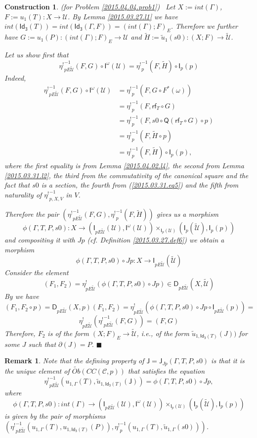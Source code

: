 \documentclass[12pt]{article}
\numberwithin{equation}{section}
\newtheorem{remark}[proposition]{Remark}
\newtheorem{construction0}[proposition]{Construction}
\newenvironment{construction}[1]{\begin{construction0}(for Problem \ref{#1})\ }{$\blacksquare$ \end{construction0}}
\newcommand{\sr}{\rightarrow}
\newcommand{\wt}{\widetilde}
\newcommand{\toCC}{CC} %
\newcommand{\C}{{\mathcal C}}  %
\newcommand{\Idx}{\mathsf{Id_3}} %
\newcommand{\J}{\mathsf{J}}
\newcommand{\U}{\mathcal{U}}
\newcommand{\D}{\mathsf{D}}
\newcommand{\I}{\mathsf{I}}
\newcommand{\rf}{\mathsf{rf}}
\newcommand{\Q}{\mathsf{Q}}
\newcommand{\etashriek}{\eta^!}
\newcommand{\etaunshriek}{{\etashriek}^{-1}}
\newcommand{\Obwt}{\wt{Ob}}
\begin{document}
\begin{construction}{2015.04.04.prob1}\rm
\label{2015.04.04.constr1} Let $X:=int(\Gamma)$, $F:=u_1(T):X\sr \U$. By Lemma
\ref{2015.03.27.l1} we have
$int(\Idx(T))=int(\Idx(\Gamma,F))=(int(\Gamma);F)_{E}$. Therefore we further
have $G:=u_1(P):(int(\Gamma);F)_{E}\sr \U$ and $\wt{H}:=\wt{u}_1(s0):(X;F)\sr
\wt{\U}$.

Let us show first that
%
$$\etaunshriek_{pE\wt{\U}}(F,G)\circ \I^{\omega}(\U)=\etaunshriek_p(F,\wt{H})\circ \I_p(p)$$
%
Indeed,
%
\begin{align*}
  \etaunshriek_{pE\wt{\U}}(F,G)\circ \I^{\omega}(\U)
    & = \etaunshriek_p(F,G\circ F^*(\omega)) \\
    & = \etaunshriek_p(F,\rf_T\circ G) \\
    & = \etaunshriek_p(F,s0\circ \Q(\rf_T\circ G)\circ p) \\
    & = \etaunshriek_p(F,\wt{H}\circ p) \\
    & = \etaunshriek_p(F,\wt{H})\circ \I_p(p),
\end{align*}
%
where the first equality is from Lemma \ref{2015.04.02.l4}, the second from
Lemma \ref{2015.03.31.l2}, the third from the commutativity of the canonical
square and the fact that $s0$ is a section, the fourth from
(\ref{2015.03.31.eq5}) and the fifth from naturality of $\etaunshriek_{p,X,V}$ in $V$.

Therefore the pair $(\etaunshriek_{pE\wt{\U}}(F,G),\etaunshriek_p(F,\wt{H}))$ gives us a
morphism
%
$$\phi(\Gamma,T,P,s0):X\sr (\I_{pE\wt{\U}}(\U), \I^{\omega}(\U)) \times_{\I_p(\U)}
(\I_p(\wt{\U}),\I_p(p))$$
%
and compositing it with $Jp$ (cf. Definition \ref{2015.03.27.def6}) we obtain a
morphism
%
$$\phi(\Gamma,T,P,s0)\circ Jp: X\sr \I_{pE\wt{\U}}(\wt{\U})$$
%
Consider the element
%
$$(F_1,F_2)=\etashriek_{pE\wt{\U}}(\phi(\Gamma,T,P,s0)\circ Jp)\in
\D_{pE\wt{\U}}(X,\wt{\U})$$
%
By \cite[Problem 3.8(1)]{fromunivwithPi} we have
%
$$(F_1,F_2\circ
p)=\D_{pE\wt{\U}}(X,p)(F_1,F_2)=\etashriek_{pE\wt{\U}}(\phi(\Gamma,T,P,s0)\circ
Jp\circ \I_{pE\wt{\U}}(p))=$$
%
$$\etashriek_{pE\wt{\U}}(\etaunshriek_{pE\wt{\U}}(F,G))=(F,G)$$
%
Therefore, $F_2$ is of the form $(X;F)_E\sr \wt{\U}$, i.e., of the form
$\wt{u}_{1,\Idx(T)}(J))$ for some $J$ such that $\partial(J)=P$.
\end{construction}
%
\begin{remark}\rm
\label{2015.05.08.rem1} Note that the defining property of
$\J=\J_{Jp}(\Gamma,T,P,s0)$ is that it is the unique element of
$\Obwt(\toCC({\C},p))$ that satisfies the equation
%
$$\etaunshriek_{pE\wt{\U}}(u_{1,\Gamma}(T),\wt{u}_{1,\Idx(T)}(\J))=\phi(\Gamma,T,P,s0)\circ
Jp,$$
%
where
%
$$\phi(\Gamma,T,P,s0):int(\Gamma)\sr
(\I_{pE\wt{\U}}(\U),\I^{\omega}(\U))\times_{\I_p(\U)}(\I_p(\wt{\U}),\I_p(p))$$
%
is given by the pair of morphisms $(\etaunshriek_{pE\wt{\U}}(u_{1,\Gamma}(T),
u_{1,\Idx(T)}(P)), \etaunshriek_p(u_{1,\Gamma}(T),\wt{u}_{1,\Gamma}(s0)))$.
\end{remark}
%
\end{document}
